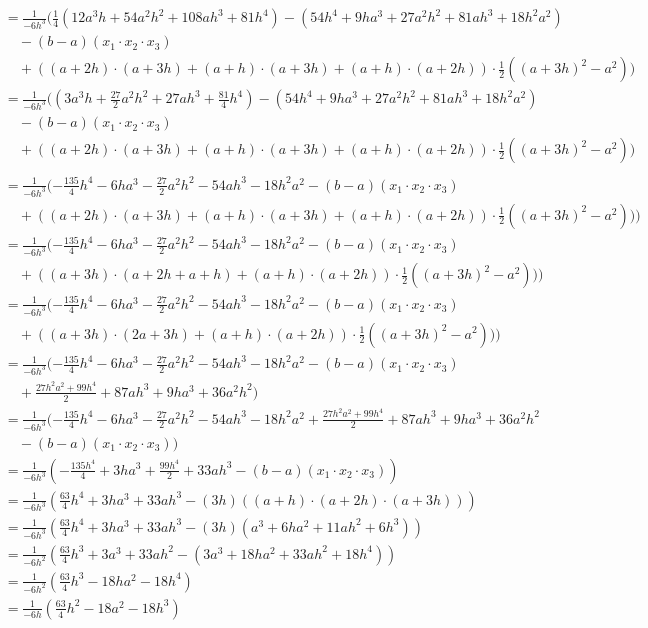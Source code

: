 \documentclass{article}
\begin{document}
\begin{align*}
&= \frac{1}{-6h^3} ( \frac{1}{4} (12a^3h+54a^2h^2+108ah^3+81h^4 ) - (54h^4+9ha^3+27a^2h^2+81ah^3+18h^2a^2)\\&\quad - (b - a)( x_1 \cdot x_2 \cdot x_3) \\ & \quad + ( (a+2h) \cdot (a+3h) + (a+h) \cdot (a+3h) + (a+h) \cdot (a+2h) ) \cdot \frac{1}{2} ( (a+3h)^2 - a^2 ) ) \\
&= \frac{1}{-6h^3} ( (3a^3h+\frac{27}{2}a^2h^2+27ah^3+\frac{81}{4}h^4 ) - (54h^4+9ha^3+27a^2h^2+81ah^3+18h^2a^2)\\ &\quad - (b - a)( x_1 \cdot x_2 \cdot x_3) \\ & \quad + ( (a+2h) \cdot (a+3h) + (a+h) \cdot (a+3h) + (a+h) \cdot (a+2h) ) \cdot \frac{1}{2} ( (a+3h)^2 - a^2 ) ) \\
\end{align*}
\newpage
\begin{align*}
&=  \frac{1}{-6h^3} (-\frac{135}{4}h^4-6ha^3-\frac{27}{2}a^2h^2-54ah^3-18h^2a^2 - (b - a)( x_1 \cdot x_2 \cdot x_3)\\ & \quad + ( (a+2h) \cdot (a+3h) + (a+h) \cdot (a+3h) + (a+h) \cdot (a+2h) ) \cdot \frac{1}{2} ( (a+3h)^2 - a^2 ) ) )\\
&=  \frac{1}{-6h^3} (-\frac{135}{4}h^4-6ha^3-\frac{27}{2}a^2h^2-54ah^3-18h^2a^2 - (b - a)( x_1 \cdot x_2 \cdot x_3)\\ & \quad + ( (a+3h)\cdot (a + 2h + a + h) + (a+h) \cdot (a+2h) ) \cdot \frac{1}{2} ( (a+3h)^2 - a^2 ) ) )\\
&=  \frac{1}{-6h^3} (-\frac{135}{4}h^4-6ha^3-\frac{27}{2}a^2h^2-54ah^3-18h^2a^2 - (b - a)( x_1 \cdot x_2 \cdot x_3)\\ & \quad + ( (a+3h)\cdot (2a + 3h) + (a+h) \cdot (a+2h) ) \cdot \frac{1}{2} ( (a+3h)^2 - a^2 ) )) \\
&=  \frac{1}{-6h^3} (-\frac{135}{4}h^4-6ha^3-\frac{27}{2}a^2h^2-54ah^3-18h^2a^2 - (b - a)( x_1 \cdot x_2 \cdot x_3)\\ & \quad + \frac{27h^2a^2+99h^4}{2}+87ah^3+9ha^3+36a^2h^2) \\
&=  \frac{1}{-6h^3} (-\frac{135}{4}h^4-6ha^3-\frac{27}{2}a^2h^2-54ah^3-18h^2a^2 + \frac{27h^2a^2+99h^4}{2}+87ah^3+9ha^3+36a^2h^2\\& \quad - (b - a)( x_1 \cdot x_2 \cdot x_3)) \\
&= \frac{1}{-6h^3} (-\frac{135h^4}{4}+3ha^3+\frac{99h^4}{2}+33ah^3 - (b - a)( x_1 \cdot x_2 \cdot x_3)) \\
&= \frac{1}{-6h^3} (\frac{63}{4}h^4+3ha^3 + 33ah^3 - (3h)( (a + h) \cdot (a + 2h) \cdot (a + 3h))) \\
&= \frac{1}{-6h^3} (\frac{63}{4}h^4+3ha^3 + 33ah^3 - (3h)(a^3+6ha^2+11ah^2+6h^3)) \\
&= \frac{1}{-6h^2} (\frac{63}{4}h^3 + 3a^3 + 33ah^2 - (3a^3 + 18ha^2 + 33ah^2 + 18h^4)) \\
&= \frac{1}{-6h^2} (\frac{63}{4}h^3 - 18ha^2 - 18h^4) \\
&= \frac{1}{-6h} (\frac{63}{4}h^2 - 18a^2 - 18h^3) \\
\end{align*}
\end{document}
